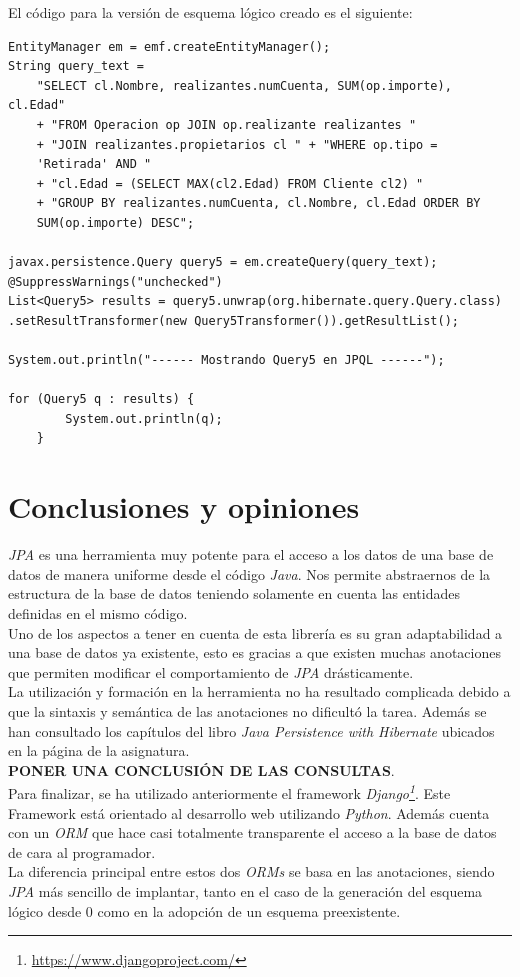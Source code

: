 \documentclass[11pt,a4paper]{article}
\begin{document}
El código para la versión de esquema lógico creado es el siguiente:
\begin{lstlisting}
EntityManager em = emf.createEntityManager();
String query_text = 
  	"SELECT cl.Nombre, realizantes.numCuenta, SUM(op.importe), cl.Edad"
	+ "FROM Operacion op JOIN op.realizante realizantes "
  	+ "JOIN realizantes.propietarios cl " + "WHERE op.tipo =
  	'Retirada' AND "
	+ "cl.Edad = (SELECT MAX(cl2.Edad) FROM Cliente cl2) "
	+ "GROUP BY realizantes.numCuenta, cl.Nombre, cl.Edad ORDER BY 			
	SUM(op.importe) DESC";

javax.persistence.Query query5 = em.createQuery(query_text);
@SuppressWarnings("unchecked")
List<Query5> results = query5.unwrap(org.hibernate.query.Query.class)
.setResultTransformer(new Query5Transformer()).getResultList();

System.out.println("------ Mostrando Query5 en JPQL ------");

for (Query5 q : results) {
      	System.out.println(q);
  	}
\end{lstlisting}

\section{Conclusiones y opiniones}

\emph{JPA} es una herramienta muy potente para el acceso a los datos de una base de datos de manera uniforme desde el código \emph{Java}. Nos permite abstraernos de la estructura de la base de datos teniendo solamente en cuenta las entidades definidas en el mismo código.\\
Uno de los aspectos a tener en cuenta de esta librería es su gran adaptabilidad a una base de datos ya existente, esto es gracias a que existen muchas anotaciones que permiten modificar el comportamiento de \emph{JPA} drásticamente.\\

La utilización y formación en la herramienta no ha resultado complicada debido a que la sintaxis y semántica de las anotaciones no dificultó la tarea. Además se han consultado los capítulos del libro \emph{Java Persistence with Hibernate} ubicados en la página de la asignatura.\\

\textbf{PONER UNA CONCLUSIÓN DE LAS CONSULTAS}.\\

Para finalizar, se ha utilizado anteriormente el framework \emph{Django\footnote{\url{https://www.djangoproject.com/}}}. Este Framework está orientado al desarrollo web utilizando \emph{Python}. Además cuenta con un \emph{ORM} que hace casi totalmente transparente el acceso a la base de datos de cara al programador.\\
La diferencia principal entre estos dos \emph{ORMs} se basa en las anotaciones, siendo \emph{JPA} más sencillo de implantar, tanto en el caso de la generación del esquema lógico desde 0 como en la adopción de un esquema preexistente.
\end{document}
